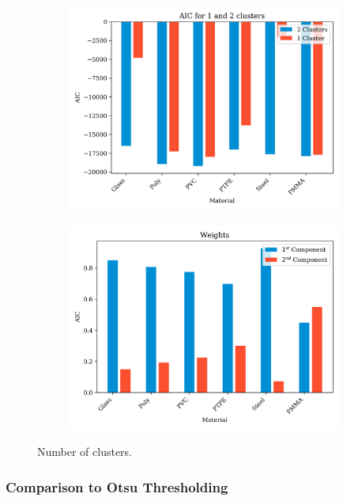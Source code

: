 \documentclass[a4paper,11pt]{article}
\begin{document}
\begin{figure}[b!]
    \centering
    \begin{subfigure}[b]{0.48\textwidth}
        \includegraphics[width=\textwidth]{figures/AIC.png}
    \end{subfigure}
    \begin{subfigure}[b]{0.48\textwidth}
        \includegraphics[width=\textwidth]{figures/weights.png}
    \end{subfigure}
    \caption{Number of clusters.}
    \label{n_bins}
\end{figure}

\subsubsection{Comparison to Otsu Thresholding}
\end{document}

